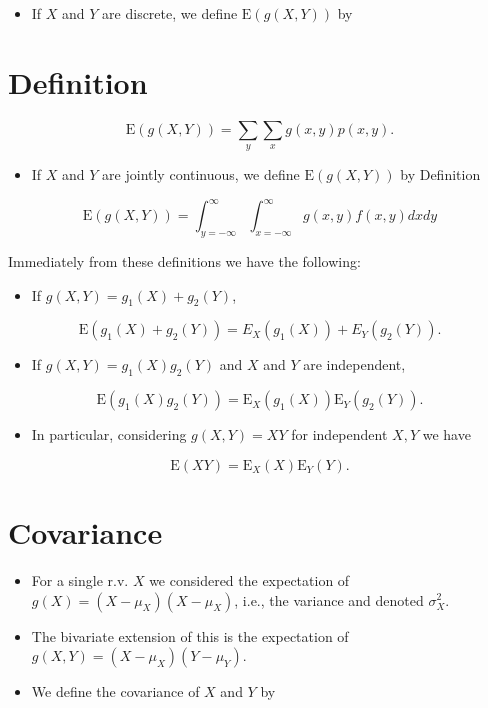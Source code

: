 \documentclass[10pt]{article}
\begin{document}
\begin{itemize}
  \item If $X$ and $Y$ are discrete, we define $\mathrm{E}(g(X, Y))$ by
\end{itemize}

\section*{Definition}
$$
\mathrm{E}(g(X, Y))=\sum_{y} \sum_{x} g(x, y) p(x, y) .
$$

\begin{itemize}
  \item If $X$ and $Y$ are jointly continuous, we define $\mathrm{E}(g(X, Y))$ by Definition
\end{itemize}

$$
\mathrm{E}(g(X, Y))=\int_{y=-\infty}^{\infty} \int_{x=-\infty}^{\infty} g(x, y) f(x, y) d x d y
$$

Immediately from these definitions we have the following:

\begin{itemize}
  \item If $g(X, Y)=g_{1}(X)+g_{2}(Y)$,
\end{itemize}

$$
\mathrm{E}\left(g_{1}(X)+g_{2}(Y)\right)=E_{X}\left(g_{1}(X)\right)+E_{Y}\left(g_{2}(Y)\right) .
$$

\begin{itemize}
  \item If $g(X, Y)=g_{1}(X) g_{2}(Y)$ and $X$ and $Y$ are independent,
\end{itemize}

$$
\mathrm{E}\left(g_{1}(X) g_{2}(Y)\right)=\mathrm{E}_{X}\left(g_{1}(X)\right) \mathrm{E}_{Y}\left(g_{2}(Y)\right) .
$$

\begin{itemize}
  \item In particular, considering $g(X, Y)=X Y$ for independent $X, Y$ we have
\end{itemize}

$$
\mathrm{E}(X Y)=\mathrm{E}_{X}(X) \mathrm{E}_{Y}(Y) .
$$

\section*{Covariance}
\begin{itemize}
  \item For a single r.v. $X$ we considered the expectation of $g(X)=\left(X-\mu_{X}\right)\left(X-\mu_{X}\right)$, i.e., the variance and denoted $\sigma_{X}^{2}$.
  \item The bivariate extension of this is the expectation of $g(X, Y)=\left(X-\mu_{X}\right)\left(Y-\mu_{Y}\right)$.
  \item We define the covariance of $X$ and $Y$ by
\end{itemize}
\end{document}
